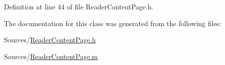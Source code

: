 Definition at line 44 of file Reader\-Content\-Page.\-h.



The documentation for this class was generated from the following files\-:\begin{DoxyCompactItemize}
\item 
Sources/\hyperlink{_reader_content_page_8h}{Reader\-Content\-Page.\-h}\item 
Sources/\hyperlink{_reader_content_page_8m}{Reader\-Content\-Page.\-m}\end{DoxyCompactItemize}
